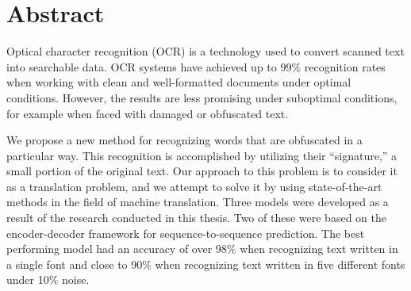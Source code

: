 
\chapter*{Abstract}
Optical character recognition (OCR) is a technology used to convert scanned text into searchable data. OCR systems have achieved up to 99\% recognition rates when working with clean and well-formatted documents under optimal conditions. However, the results are less promising under suboptimal conditions, for example when faced with damaged or obfuscated text. \newline

\noindent We propose a new method for recognizing words that are obfuscated in a particular way. This recognition is accomplished by utilizing their ``signature,'' a small portion of the original text. Our approach to this problem is to consider it as a translation problem, and we attempt to solve it by using state-of-the-art methods in the field of machine translation. Three models were developed as a result of the research conducted in this thesis. Two of these were based on the encoder-decoder framework for sequence-to-sequence prediction. The best performing model had an accuracy of over 98\% when recognizing text written in a single font and close to 90\% when recognizing text written in five different fonts under 10\% noise.